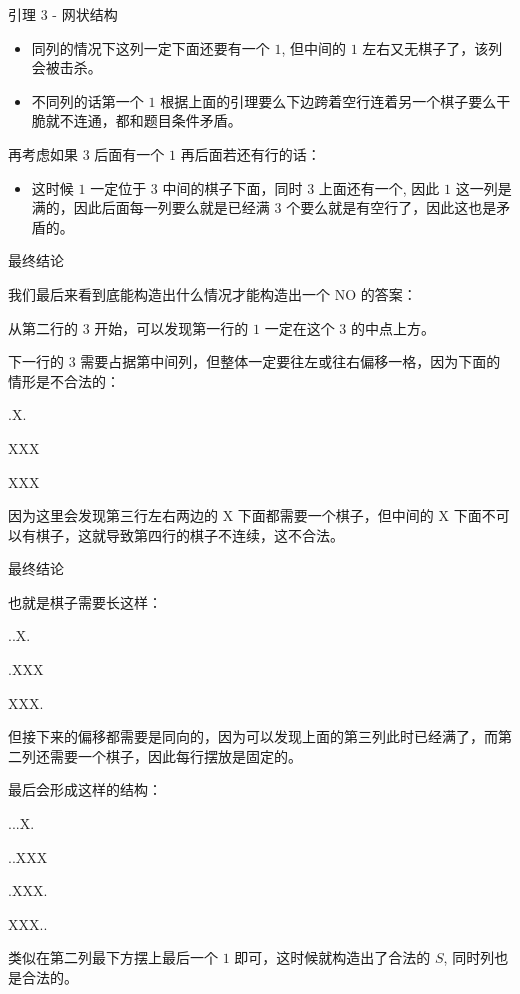 \documentclass{beamer}
\newcommand{\TT}[1] {{\ttfamily #1}}
\begin{document}
{\begin{frame}{引理 3 - 网状结构}
\begin{itemize}
  \item 同列的情况下这列一定下面还要有一个 $1$, 但中间的 $1$ 左右又无棋子了，该列会被击杀。
  \item 不同列的话第一个 $1$ 根据上面的引理要么下边跨着空行连着另一个棋子要么干脆就不连通，都和题目条件矛盾。
\end{itemize}

再考虑如果 $3$ 后面有一个 $1$ 再后面若还有行的话：

\begin{itemize}
  \item 这时候 $1$ 一定位于 $3$ 中间的棋子下面，同时 $3$ 上面还有一个, 因此 $1$ 这一列是满的，因此后面每一列要么就是已经满 $3$ 个要么就是有空行了，因此这也是矛盾的。
\end{itemize}

\end{frame}

\begin{frame}{最终结论}
  
我们最后来看到底能构造出什么情况才能构造出一个 \TT{NO} 的答案：

从第二行的 $3$ 开始，可以发现第一行的 $1$ 一定在这个 $3$ 的中点上方。

下一行的 $3$ 需要占据第中间列，但整体一定要往左或往右偏移一格，因为下面的情形是不合法的：

\TT{.X.}

\TT{XXX}

\TT{XXX}

因为这里会发现第三行左右两边的 \TT{X} 下面都需要一个棋子，但中间的 \TT{X} 下面不可以有棋子，这就导致第四行的棋子不连续，这不合法。 


\end{frame}

\begin{frame}{最终结论}
  
也就是棋子需要长这样：

\TT{..X.}

\TT{.XXX}

\TT{XXX.}

但接下来的偏移都需要是同向的，因为可以发现上面的第三列此时已经满了，而第二列还需要一个棋子，因此每行摆放是固定的。

最后会形成这样的结构：

\TT{...X.}

\TT{..XXX}

\TT{.XXX.}

\TT{XXX..}

类似在第二列最下方摆上最后一个 $1$ 即可，这时候就构造出了合法的 $S$, 同时列也是合法的。


\end{frame}}
\end{document}
